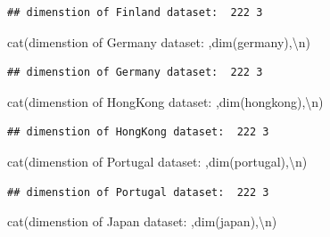 \documentclass[
]{article}
\newenvironment{Shaded}{\begin{snugshade}}{\end{snugshade}}
\newcommand{\FunctionTok}[1]{\textcolor[rgb]{0.00,0.00,0.00}{#1}}
\newcommand{\NormalTok}[1]{#1}
\newcommand{\SpecialCharTok}[1]{\textcolor[rgb]{0.00,0.00,0.00}{#1}}
\newcommand{\StringTok}[1]{\textcolor[rgb]{0.31,0.60,0.02}{#1}}
\begin{document}
\begin{verbatim}
## dimenstion of Finland dataset:  222 3
\end{verbatim}

\begin{Shaded}
\begin{Highlighting}[]
\FunctionTok{cat}\NormalTok{(}\StringTok{\textquotesingle{}dimenstion of Germany dataset: \textquotesingle{}}\NormalTok{,}\FunctionTok{dim}\NormalTok{(germany),}\StringTok{\textquotesingle{}}\SpecialCharTok{\textbackslash{}n}\StringTok{\textquotesingle{}}\NormalTok{)}
\end{Highlighting}
\end{Shaded}

\begin{verbatim}
## dimenstion of Germany dataset:  222 3
\end{verbatim}

\begin{Shaded}
\begin{Highlighting}[]
\FunctionTok{cat}\NormalTok{(}\StringTok{\textquotesingle{}dimenstion of HongKong dataset: \textquotesingle{}}\NormalTok{,}\FunctionTok{dim}\NormalTok{(hongkong),}\StringTok{\textquotesingle{}}\SpecialCharTok{\textbackslash{}n}\StringTok{\textquotesingle{}}\NormalTok{)}
\end{Highlighting}
\end{Shaded}

\begin{verbatim}
## dimenstion of HongKong dataset:  222 3
\end{verbatim}

\begin{Shaded}
\begin{Highlighting}[]
\FunctionTok{cat}\NormalTok{(}\StringTok{\textquotesingle{}dimenstion of Portugal dataset: \textquotesingle{}}\NormalTok{,}\FunctionTok{dim}\NormalTok{(portugal),}\StringTok{\textquotesingle{}}\SpecialCharTok{\textbackslash{}n}\StringTok{\textquotesingle{}}\NormalTok{)}
\end{Highlighting}
\end{Shaded}

\begin{verbatim}
## dimenstion of Portugal dataset:  222 3
\end{verbatim}

\begin{Shaded}
\begin{Highlighting}[]
\FunctionTok{cat}\NormalTok{(}\StringTok{\textquotesingle{}dimenstion of Japan dataset: \textquotesingle{}}\NormalTok{,}\FunctionTok{dim}\NormalTok{(japan),}\StringTok{\textquotesingle{}}\SpecialCharTok{\textbackslash{}n}\StringTok{\textquotesingle{}}\NormalTok{)}
\end{Highlighting}
\end{Shaded}
\end{document}
